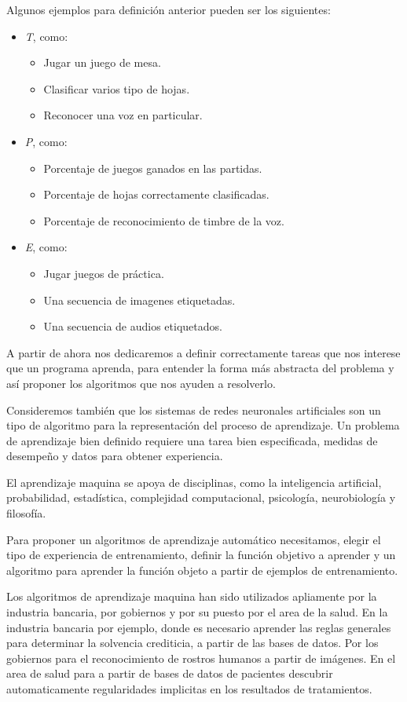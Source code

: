 Algunos ejemplos para definición anterior pueden ser los siguientes:
\begin{itemize}
  \item \emph{T}, como:
   \begin{itemize}
    \item Jugar un juego de mesa.
    \item Clasificar varios tipo de hojas.
    \item Reconocer una voz en particular.
   \end{itemize}
  \item \emph{P}, como:
    \begin{itemize}
     \item Porcentaje de juegos ganados en las partidas.
     \item Porcentaje de hojas correctamente clasificadas.
     \item Porcentaje de reconocimiento de timbre de la voz.
    \end{itemize}
  \item \emph{E}, como:
    \begin{itemize}
        \item Jugar juegos de práctica.
        \item Una secuencia de imagenes etiquetadas.
        \item Una secuencia de audios etiquetados.
    \end{itemize}

\end{itemize}


A partir de ahora nos dedicaremos a definir correctamente tareas que nos interese que un programa aprenda, para entender la forma más abstracta del problema y así proponer los algoritmos que nos ayuden a resolverlo.

Consideremos también que los sistemas de redes neuronales artificiales son un tipo de algoritmo para la representación del proceso de aprendizaje. Un problema de aprendizaje bien definido requiere una tarea bien especificada, medidas de desempeño y datos para obtener experiencia. 

El aprendizaje maquina se apoya de disciplinas, como la inteligencia artificial, probabilidad, estadística, complejidad computacional, psicología, neurobiología y filosofía.

Para proponer un algoritmos de aprendizaje automático necesitamos, elegir el tipo de experiencia de entrenamiento, definir la función objetivo a aprender y un algoritmo para aprender la función objeto a partir de ejemplos de entrenamiento.

Los algoritmos de aprendizaje maquina han sido utilizados apliamente por la industria bancaria, por gobiernos y por su puesto por el area de la salud. En la industria bancaria por ejemplo, donde es necesario aprender las reglas generales para determinar la solvencia crediticia, a partir de las bases de datos. Por los gobiernos para el reconocimiento de rostros humanos a partir de imágenes. En el area de salud para a partir de bases de datos de pacientes descubrir automaticamente regularidades implicitas en los resultados de tratamientos.





